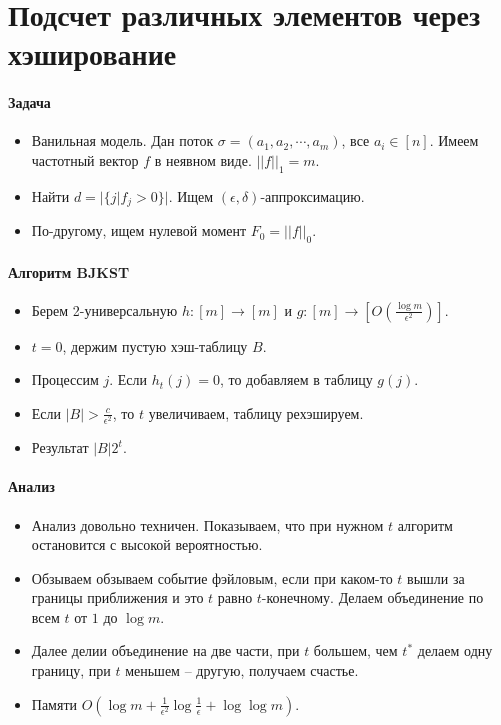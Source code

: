 \section{Подсчет различных элементов через хэширование} %
\label{sec:eds_via_hashing}

\paragraph{Задача} %
\label{par:problem}

\begin{itemize}
	\item Ванильная модель. Дан поток $\sigma = (a_1, a_2, \cdots, a_m)$, все $a_i \in [n]$. Имеем частотный вектор $f$ в неявном виде. $||f||_1 = m$. 
	\item Найти $d = |\{j | f_j > 0 \}|$. Ищем $(\epsilon, \delta)$-аппроксимацию.
	\item По-другому, ищем нулевой момент $F_0 = ||f||_0$.
\end{itemize}


\paragraph{Алгоритм BJKST} %
\label{par:bjkst}

\begin{itemize}
	\item Берем 2-универсальную $h : [m] \rightarrow [m]$ и $g : [m] \rightarrow [O(\frac{\log m}{\epsilon^2})]$.
	\item $t = 0$, держим пустую хэш-таблицу $B$.
	\item Процессим $j$. Если $h_t(j) = 0$, то добавляем в таблицу $g(j)$.
	\item Если $|B| > \frac{c}{\epsilon^2}$, то $t$ увеличиваем, таблицу рехэшируем.
	\item Результат $|B|2^t$.
\end{itemize}


\paragraph{Анализ} %
\label{par:bjkst_analysis}

\begin{itemize}
	\item Анализ довольно техничен. Показываем, что при нужном $t$ алгоритм остановится с высокой вероятностью.
	\item Обзываем обзываем событие фэйловым, если при каком-то $t$ вышли за границы приближения и это $t$ равно $t$-конечному. Делаем объединение по всем $t$ от $1$ до $\log m$.
	\item Далее делии объединение на две части, при $t$ большем, чем $t^*$ делаем одну границу, при $t$ меньшем -- другую, получаем счастье.
 	\item Памяти $O(\log m + \frac{1}{\epsilon^2} \log \frac{1}{\epsilon} + \log \log m)$.

\end{itemize}


